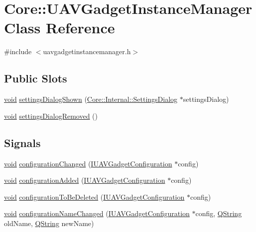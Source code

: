 \hypertarget{class_core_1_1_u_a_v_gadget_instance_manager}{\section{\-Core\-:\-:\-U\-A\-V\-Gadget\-Instance\-Manager \-Class \-Reference}
\label{class_core_1_1_u_a_v_gadget_instance_manager}
}


{\ttfamily \#include $<$uavgadgetinstancemanager.\-h$>$}

\subsection*{\-Public \-Slots}
\begin{DoxyCompactItemize}
\item 
\hyperlink{group___u_a_v_objects_plugin_ga444cf2ff3f0ecbe028adce838d373f5c}{void} \hyperlink{group___core_plugin_ga1d8e47ad72e66fd0f3a47ffa62fb7728}{settings\-Dialog\-Shown} (\hyperlink{class_core_1_1_internal_1_1_settings_dialog}{\-Core\-::\-Internal\-::\-Settings\-Dialog} $\ast$settings\-Dialog)
\item 
\hyperlink{group___u_a_v_objects_plugin_ga444cf2ff3f0ecbe028adce838d373f5c}{void} \hyperlink{group___core_plugin_ga602b76a9cb7212662ec3e902a6b92b77}{settings\-Dialog\-Removed} ()
\end{DoxyCompactItemize}
\subsection*{\-Signals}
\begin{DoxyCompactItemize}
\item 
\hyperlink{group___u_a_v_objects_plugin_ga444cf2ff3f0ecbe028adce838d373f5c}{void} \hyperlink{group___core_plugin_ga99c492de558d9dccc16073ff82d79419}{configuration\-Changed} (\hyperlink{class_core_1_1_i_u_a_v_gadget_configuration}{\-I\-U\-A\-V\-Gadget\-Configuration} $\ast$config)
\item 
\hyperlink{group___u_a_v_objects_plugin_ga444cf2ff3f0ecbe028adce838d373f5c}{void} \hyperlink{group___core_plugin_gaca35112f1648a58ef28001ee643931bc}{configuration\-Added} (\hyperlink{class_core_1_1_i_u_a_v_gadget_configuration}{\-I\-U\-A\-V\-Gadget\-Configuration} $\ast$config)
\item 
\hyperlink{group___u_a_v_objects_plugin_ga444cf2ff3f0ecbe028adce838d373f5c}{void} \hyperlink{group___core_plugin_gaff37c6a99697161f556ab317acd527a5}{configuration\-To\-Be\-Deleted} (\hyperlink{class_core_1_1_i_u_a_v_gadget_configuration}{\-I\-U\-A\-V\-Gadget\-Configuration} $\ast$config)
\item 
\hyperlink{group___u_a_v_objects_plugin_ga444cf2ff3f0ecbe028adce838d373f5c}{void} \hyperlink{group___core_plugin_ga00b3bb265a26c73dee0bd4842db52315}{configuration\-Name\-Changed} (\hyperlink{class_core_1_1_i_u_a_v_gadget_configuration}{\-I\-U\-A\-V\-Gadget\-Configuration} $\ast$config, \hyperlink{group___u_a_v_objects_plugin_gab9d252f49c333c94a72f97ce3105a32d}{\-Q\-String} old\-Name, \hyperlink{group___u_a_v_objects_plugin_gab9d252f49c333c94a72f97ce3105a32d}{\-Q\-String} new\-Name)
\end{DoxyCompactItemize}
